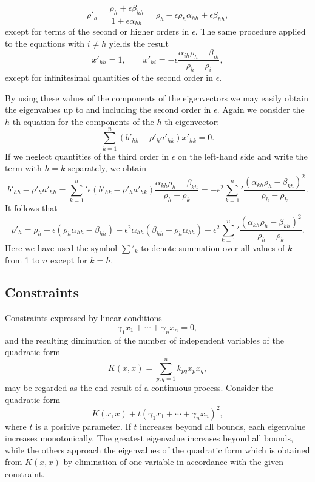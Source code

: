 \[
\rho'_h=\frac{\rho_h+\epsilon\beta_{hh}}{1+\epsilon\alpha_{hh}}
=\rho_h-\epsilon\rho_h\alpha_{hh}+\epsilon\beta_{hh},
\]
except for terms of the second or higher orders in $\epsilon$. The same procedure applied to the equations with $i\ne h$ yields the result
\[
x'_{hh}=1,\qquad x'_{hi}=-\epsilon\frac{\alpha_{ih}\rho_h-\beta_{ih}}{\rho_h-\rho_i},
\]
except for infinitesimal quantities of the second order in $\epsilon$.

By using these values of the components of the eigenvectors we may easily obtain the eigenvalues up to and including the second order in $\epsilon$. Again we consider the $h$-th equation for the components of the $h$-th eigenvector:
\[
\sum_{k=1}^{n}(b'_{hk}-\rho'_h a'_{hk})x'_{hk}=0.
\]
If we neglect quantities of the third order in $\epsilon$ on the left-hand side and write the term with $h=k$ separately, we obtain
\[
b'_{hh}-\rho'_h a'_{hh}
=\sum_{k=1}^{n}{}'\epsilon(b'_{hk}-\rho'_h a'_{hk})
\frac{\alpha_{kh}\rho_h-\beta_{kh}}{\rho_h-\rho_k}
=-\epsilon^2\sum_{k=1}^{n}{}'\frac{(\alpha_{kh}\rho_h-\beta_{kh})^2}{\rho_h-\rho_k}.
\]
It follows that
\[
\rho'_h=\rho_h-\epsilon(\rho_h\alpha_{hh}-\beta_{hh})
-\epsilon^2\alpha_{hh}(\beta_{hh}-\rho_h\alpha_{hh})
+\epsilon^2\sum_{k=1}^{n}{}'\frac{(\alpha_{kh}\rho_h-\beta_{kh})^2}{\rho_h-\rho_k}.
\]
Here we have used the symbol $\sum'_{k}$ to denote summation over all values of $k$ from 1 to $n$ except for $k=h$.

\subsection{Constraints}
Constraints expressed by linear conditions
\[
\gamma_1x_1+\cdots+\gamma_nx_n=0,
\]
and the resulting diminution of the number of independent variables of the quadratic form
\[
K(x,x)=\sum_{p,q=1}^{n}k_{pq}x_px_q,
\]
may be regarded as the end result of a continuous process. Consider the quadratic form
\[
K(x,x)+t(\gamma_1x_1+\cdots+\gamma_nx_n)^2,
\]
where $t$ is a positive parameter. If $t$ increases beyond all bounds, each eigenvalue increases monotonically. The greatest eigenvalue increases beyond all bounds, while the others approach the eigenvalues of the quadratic form which is obtained from $K(x,x)$ by elimination of one variable in accordance with the given constraint.


